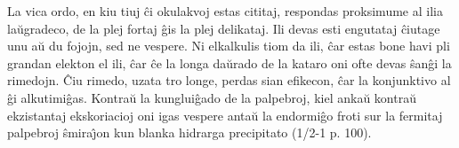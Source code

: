 La vica ordo, en kiu tiuj \^ci okulakvoj estas cititaj, respondas
proksimume al ilia la\u ugradeco, de la plej fortaj \^gis la plej
delikataj. Ili devas esti engutataj \^ciutage unu a\u u du fojojn,
sed ne vespere. Ni elkalkulis tiom da ili, \^car estas bone havi pli
grandan elekton el ili, \^car \^ce la longa da\u urado de la kataro
oni ofte devas \^san\^gi la rimedojn. \^Ciu rimedo, uzata tro longe,
perdas sian efikecon, \^car la konjunktivo al \^gi alkutimi\^gas.
Kontra\u u la kunglui\^gado de la palpebroj, kiel anka\u u kontra\u
u ekzistantaj ekskoriacioj oni igas vespere anta\u u la endormi\^go
froti sur la fermitaj palpebroj \^smira\^{\j}on kun blanka hidrarga
precipitato (1/2-1 p. 100).

      

\smallrule{}
